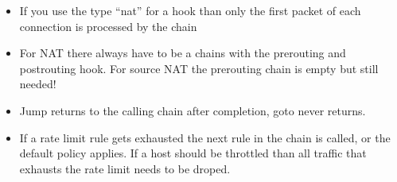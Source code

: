 \documentclass{report}
\begin{document}
\begin{itemize}
\item
  If you use the type ``nat'' for a hook than only the first packet of
  each connection is processed by the chain
\item
  For NAT there always have to be a chains with the prerouting and
  postrouting hook. For source NAT the prerouting chain is empty but
  still needed!
\item
  Jump returns to the calling chain after completion, goto never
  returns.
\item
  If a rate limit rule gets exhausted the next rule in the chain is
  called, or the default policy applies. If a host should be throttled
  than all traffic that exhausts the rate limit needs to be droped.

\end{itemize}
\end{document}
